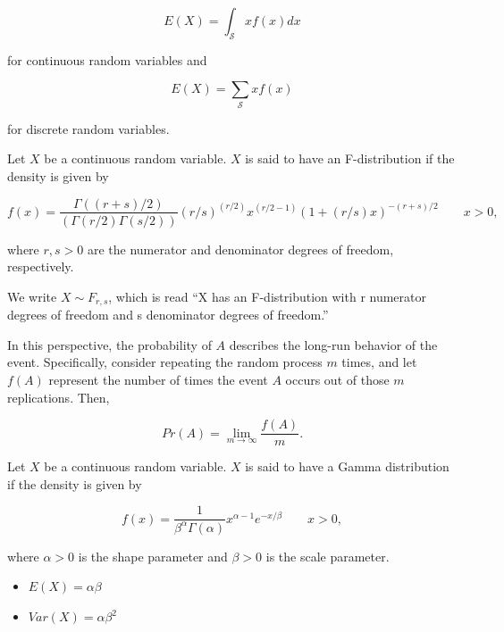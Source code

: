 \documentclass[
  letterpaper,
  DIV=11,
  numbers=noendperiod]{scrreprt}
\providecommand{\tightlist}{%
  \setlength{\itemsep}{0pt}\setlength{\parskip}{0pt}}\usepackage{longtable,booktabs,array}
\theoremstyle{definition}
\theoremstyle{definition}
\theoremstyle{plain}
\theoremstyle{remark}
\begin{document}
\[E(X) = \int_{\mathcal{S}} x f(x) dx\]

for continuous random variables and

\[E(X) = \sum_{\mathcal{S}} x f(x)\]

for discrete random variables.

\begin{description}
\tightlist
\item[F-Distribution (Definition~\ref{def-f-distribution})]
Let \(X\) be a continuous random variable. \(X\) is said to have an
F-distribution if the density is given by
\end{description}

\[f(x) = \frac{\Gamma((r + s)/2)}{(\Gamma(r/2) \Gamma(s/2))} (r/s)^{(r/2)} x^{(r/2 - 1)} (1 + (r/s) x)^{-(r + s)/2} \qquad x > 0,\]

where \(r,s > 0\) are the numerator and denominator degrees of freedom,
respectively.

We write \(X \sim F_{r, s}\), which is read ``X has an F-distribution
with r numerator degrees of freedom and s denominator degrees of
freedom.''

\begin{description}
\tightlist
\item[Frequentist Interpretation of Probability
(Definition~\ref{def-frequentist-interpretation})]
In this perspective, the probability of \(A\) describes the long-run
behavior of the event. Specifically, consider repeating the random
process \(m\) times, and let \(f(A)\) represent the number of times the
event \(A\) occurs out of those \(m\) replications. Then,
\end{description}

\[Pr(A) = \lim_{m \rightarrow \infty} \frac{f(A)}{m}.\]

\begin{description}
\tightlist
\item[Gamma Distribution (Definition~\ref{def-gamma-distribution})]
Let \(X\) be a continuous random variable. \(X\) is said to have a Gamma
distribution if the density is given by
\end{description}

\[f(x) = \frac{1}{\beta^{\alpha} \Gamma(\alpha)} x^{\alpha - 1} e^{-x/\beta} \qquad x > 0,\]

where \(\alpha > 0\) is the shape parameter and \(\beta > 0\) is the
scale parameter.

\begin{itemize}
\tightlist
\item
  \(E(X) = \alpha\beta\)
\item
  \(Var(X) = \alpha\beta^2\)
\end{itemize}
\end{document}
